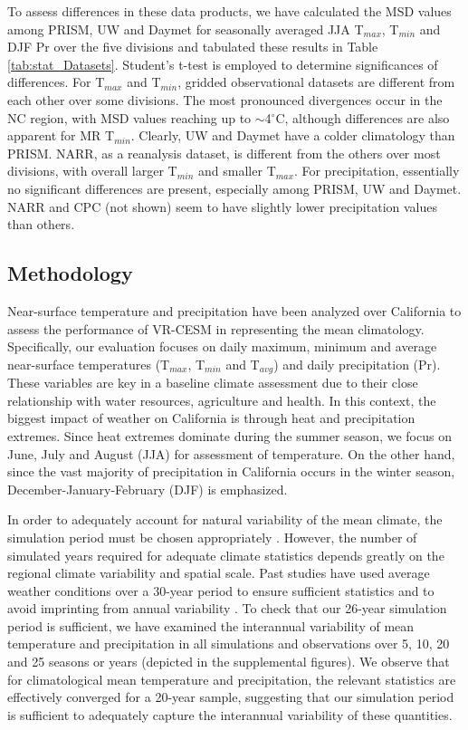 \documentclass[draft,ms]{agutex}   %
\begin{document}
\begin{article}
To assess differences in these data products, we have calculated the MSD values among PRISM, UW and Daymet for seasonally averaged JJA T$_{max}$, T$_{min}$ and DJF Pr over the five divisions and tabulated these results in Table \ref{tab:stat_Datasets}. Student's t-test is employed to determine significances of differences. For T$_{max}$ and T$_{min}$, gridded observational datasets are different from each other over some divisions.  The most pronounced divergences occur in the NC region, with MSD values reaching up to $\sim$4$^\circ$C, although differences are also apparent for MR T$_{min}$. Clearly, UW and Daymet have a colder climatology than PRISM. NARR, as a reanalysis dataset, is different from the others over most divisions, with overall larger T$_{min}$ and smaller T$_{max}$. For precipitation, essentially no significant differences are present, especially among PRISM, UW and Daymet. NARR and CPC (not shown) seem to have slightly lower precipitation values than others.

\subsection{Methodology}

Near-surface temperature and precipitation have been analyzed over California to assess the performance of VR-CESM in representing the mean climatology. Specifically, our evaluation focuses on daily maximum, minimum and average near-surface temperatures (T$_{max}$, T$_{min}$ and T$_{avg}$) and daily precipitation (Pr). These variables are key in a baseline climate assessment due to their close relationship with water resources, agriculture and health. In this context, the biggest impact of weather on California is through heat and precipitation extremes. Since heat extremes dominate during the summer season, we focus on June, July and August (JJA) for assessment of temperature. On the other hand, since the vast majority of precipitation in California occurs in the winter season, December-January-February (DJF) is emphasized.  

In order to adequately account for natural variability of the mean climate, the simulation period must be chosen appropriately \citep{solomon2007climate}. However, the number of simulated years required for adequate climate statistics depends greatly on the regional climate variability and spatial scale. Past studies have used average weather conditions over a 30-year period to ensure sufficient statistics and to avoid imprinting from annual variability \citep{dinse2009climate}. To check that our 26-year simulation period is sufficient, we have examined the interannual variability of mean temperature and precipitation in all simulations and observations over 5, 10, 20 and 25 seasons or years (depicted in the supplemental figures). We observe that for climatological mean temperature and precipitation, the relevant statistics are effectively converged for a 20-year sample, suggesting that our simulation period is sufficient to adequately capture the interannual variability of these quantities. 



\end{article}
\end{document}
